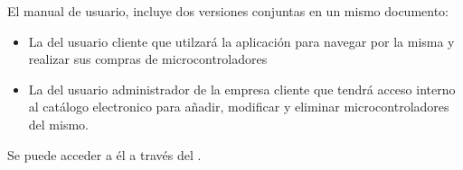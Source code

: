 El manual de usuario, incluye dos versiones conjuntas en un mismo documento:
\begin{itemize}
	\item La del usuario cliente que utilzará la aplicación para navegar por la misma y realizar sus compras de microcontroladores
	\item La del usuario administrador de la empresa cliente que tendrá acceso interno al catálogo electronico para añadir, modificar y eliminar microcontroladores del mismo.
\end{itemize}

Se puede acceder a él a través del .
